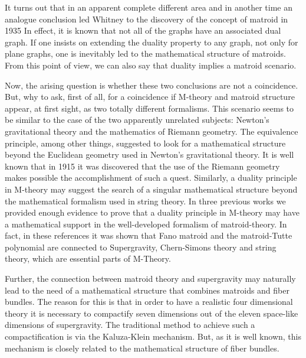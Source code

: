 \documentclass[a4paper,12pt]{article}
\begin{document}
It turns out that in an apparent complete different area and in another time
an analogue conclusion led Whitney\coordHE{} to the discovery of the concept of
matroid in 1935\coordHE{} In effect, it is known that not all of the graphs have an
associated dual graph. If one insists on extending the duality property to
any graph, not only for plane graphs, one is inevitably led to the
mathematical structure of matroids. From this point of view, we can also say
that duality implies a matroid scenario.

Now, the arising question is whether these two conclusions are not a
coincidence. But, why to ask, first of all, for a coincidence if M-theory
and matroid structure appear, at first sight, as two totally different
formalisms. This scenario seems to be similar to the case of the two
apparently unrelated subjects: Newton's gravitational theory and the
mathematics of Riemann geometry. The equivalence principle, among other
things, suggested to look for a mathematical structure beyond the Euclidean
geometry used in Newton's gravitational theory. It is well known that in
1915 it was discovered that the use of the Riemann geometry makes possible
the accomplishment of such a quest. Similarly, a duality principle in
M-theory may suggest the search of a singular mathematical structure beyond
the mathematical formalism used in string theory. In three previous works\coordHE{} we provided enough evidence to prove that a duality principle in
M-theory may have a mathematical support in the well-developed formalism of
matroid-theory\coordHE{}. In fact, in these references it was shown that Fano
matroid and the matroid-Tutte polynomial are connected to \coordHE{}
Supergravity, Chern-Simons theory and string theory, which are essential
parts of M-Theory.

Further, the connection between matroid theory and \coordHE{} supergravity may
naturally lead to the need of a mathematical structure that combines
matroids and fiber bundles. The reason for this is that in order to have a
realistic four dimensional theory it is necessary to compactify seven
dimensions out of the eleven space-like dimensions of \coordHE{} supergravity.
The traditional method to achieve such a compactification is via the
Kaluza-Klein mechanism. But, as it is well known, this mechanism is closely
related to the mathematical structure of fiber bundles.
\end{document}
